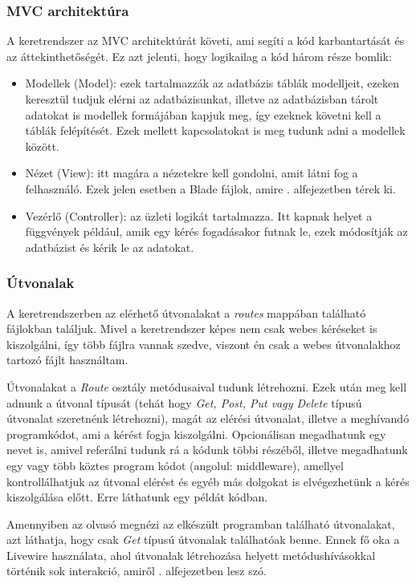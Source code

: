 \documentclass[
]{thesis-ekf}
\theoremstyle{definition}
\theoremstyle{remark}
\begin{document}
\subsubsection{MVC architektúra}

A keretrendszer az MVC architektúrát követi, ami segíti a kód karbantartását és az áttekinthetőségét.\cite{mvc} Ez azt jelenti, hogy logikailag a kód három része bomlik:
\begin{itemize}
	\item Modellek (Model): ezek tartalmazzák az adatbázis táblák modelljeit, ezeken keresztül tudjuk elérni az adatbázisunkat, illetve az adatbázisban tárolt adatokat is modellek formájában kapjuk meg, így ezeknek követni kell a táblák felépítését. Ezek mellett kapcsolatokat is meg tudunk adni a modellek között.
	\item Nézet (View): itt magára a nézetekre kell gondolni, amit látni fog a felhasználó. Ezek jelen esetben a Blade\cite{blade} fájlok, amire . alfejezetben térek ki.
	\item Vezérlő (Controller): az üzleti logikát tartalmazza. Itt kapnak helyet a függvények például, amik egy kérés fogadásakor futnak le, ezek módosítják az adatbázist és kérik le az adatokat.
\end{itemize}

\subsubsection{Útvonalak}

A keretrendszerben az elérhető útvonalakat a \emph{routes} mappában található fájlokban találjuk. Mivel a keretrendszer képes nem csak webes kéréseket is kiszolgálni, így több fájlra vannak szedve, viszont én csak a webes útvonalakhoz tartozó fájlt használtam.

Útvonalakat a \emph{Route} osztály metódusaival tudunk létrehozni. Ezek után meg kell adnunk a útvonal típusát (tehát hogy \emph{Get, Post, Put vagy Delete} típusú útvonalat szeretnénk létrehozni), magát az elérési útvonalat, illetve a meghívandó programkódot, ami a kérést fogja kiszolgálni. Opcionálisan megadhatunk egy nevet is, amivel referálni tudunk rá a kódunk többi részéből, illetve megadhatunk egy vagy több köztes program kódot (angolul: middleware), amellyel kontrollálhatjuk az útvonal elérést és egyéb más dolgokat is elvégezhetünk a kérés kiszolgálása előtt.\cite{routing} Erre láthatunk egy példát  kódban.

Amennyiben az olvasó megnézi az elkészült programban található útvonalakat, azt láthatja, hogy csak \emph{Get} típusú útvonalak találhatóak benne. Ennek fő oka a Livewire\cite{livewire} használata, ahol útvonalak létrehozása helyett metódushívásokkal történik sok interakció, amiről . alfejezetben lesz szó.
\end{document}
